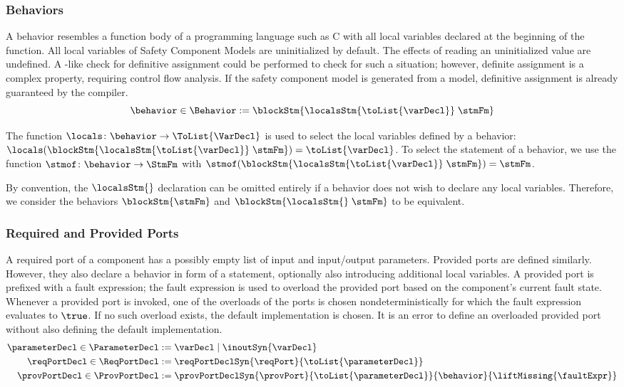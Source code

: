 \documentclass[a4paper,10pt,english]{article}
\begin{document}
\subsubsection{Behaviors}
A behavior resembles a function body of a programming language such as C with all local variables declared at the beginning of the
function. All local variables of Safety Component Models are uninitialized by default. The effects of reading an
uninitialized value are undefined. A \CSharp-like check for definitive assignment could be performed to check for such a
situation; however, definite assignment is a complex property, requiring control flow analysis. If the safety component model is
generated from a \SafetySharp model, definitive assignment is already guaranteed by the \CSharp compiler.
\begin{equation*}
	\behavior \in \Behavior := \blockStm{\localsStm{\toList{\varDecl}} \; \stmFm}
\end{equation*}

The function $\locals \colon \behavior \rightarrow \ToList{\VarDecl}$ is used to select the local variables defined by a behavior:
$\locals(\blockStm{\localsStm{\toList{\varDecl}} \; \stmFm}) = \toList{\varDecl}$. To select the statement of a behavior, we use
the function $\stmof \colon \behavior \rightarrow \StmFm$ with $\stmof(\blockStm{\localsStm{\toList{\varDecl}} \; \stmFm}) =
\stmFm$.

By convention, the $\localsStm{}$ declaration can be omitted entirely if a behavior does not wish to declare any local variables.
Therefore, we consider the behaviors $\blockStm{\stmFm}$ and $\blockStm{\localsStm{\empty} \; \stmFm}$ to be equivalent.

\subsubsection{Required and Provided Ports}
A required port of a component has a possibly empty list of input and input/output parameters.
Provided ports are defined similarly. However, they also
declare a behavior in form of a statement, optionally also introducing additional local variables. A provided port is prefixed
with a fault expression; the fault expression is used to overload the provided port based on the component's current fault state.
Whenever a provided port is invoked, one of the overloads of the ports is chosen nondeterministically for which the fault
expression evaluates to $\true$. If no such overload exists, the default implementation is chosen. It is an error to define an
overloaded provided port without also defining the default implementation. 
\begin{align*}
	\parameterDecl \in \ParameterDecl &:=
		\varDecl \mid \inoutSyn{\varDecl}
	\\
	\reqPortDecl \in \ReqPortDecl &:=
		\reqPortDeclSyn{\reqPort}{\toList{\parameterDecl}}
	\\
	\provPortDecl \in \ProvPortDecl &:= \provPortDeclSyn{\provPort}
		{\toList{\parameterDecl}}
		{\behavior}
		{\liftMissing{\faultExpr}}
\end{align*}
\end{document}
